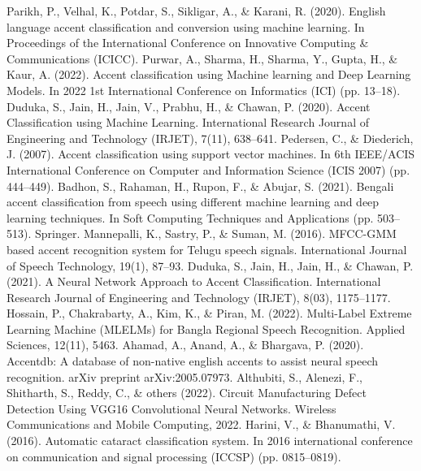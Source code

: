 \begin{thebibliography}{9}
 Parikh, P., Velhal, K., Potdar, S., Sikligar, A., \& Karani, R. (2020). English language accent classification and conversion using machine learning. In Proceedings of the International Conference on Innovative Computing & Communications (ICICC).
 Purwar, A., Sharma, H., Sharma, Y., Gupta, H., \& Kaur, A. (2022). Accent classification using Machine learning and Deep Learning Models. In 2022 1st International Conference on Informatics (ICI) (pp. 13–18).
 Duduka, S., Jain, H., Jain, V., Prabhu, H., \& Chawan, P. (2020). Accent Classification using Machine Learning. International Research Journal of Engineering and Technology (IRJET), 7(11), 638–641.
 Pedersen, C., \& Diederich, J. (2007). Accent classification using support vector machines. In 6th IEEE/ACIS International Conference on Computer and Information Science (ICIS 2007) (pp. 444–449).
 Badhon, S., Rahaman, H., Rupon, F., \& Abujar, S. (2021). Bengali accent classification from speech using different machine learning and deep learning techniques. In Soft Computing Techniques and Applications (pp. 503–513). Springer.
 Mannepalli, K., Sastry, P., \& Suman, M. (2016). MFCC-GMM based accent recognition system for Telugu speech signals. International Journal of Speech Technology, 19(1), 87–93.
 Duduka, S., Jain, H., Jain, H., \& Chawan, P. (2021). A Neural Network Approach to Accent Classification. International Research Journal of Engineering and Technology (IRJET), 8(03), 1175–1177.
 Hossain, P., Chakrabarty, A., Kim, K., \& Piran, M. (2022). Multi-Label Extreme Learning Machine (MLELMs) for Bangla Regional Speech Recognition. Applied Sciences, 12(11), 5463.
 Ahamad, A., Anand, A., \& Bhargava, P. (2020). Accentdb: A database of non-native english accents to assist neural speech recognition. arXiv preprint arXiv:2005.07973.
 Althubiti, S., Alenezi, F., Shitharth, S., Reddy, C., \& others (2022). Circuit Manufacturing Defect Detection Using VGG16 Convolutional Neural Networks. Wireless Communications and Mobile Computing, 2022.
 Harini, V., \& Bhanumathi, V. (2016). Automatic cataract classification system. In 2016 international conference on communication and signal processing (ICCSP) (pp. 0815–0819).
\end{thebibliography}

